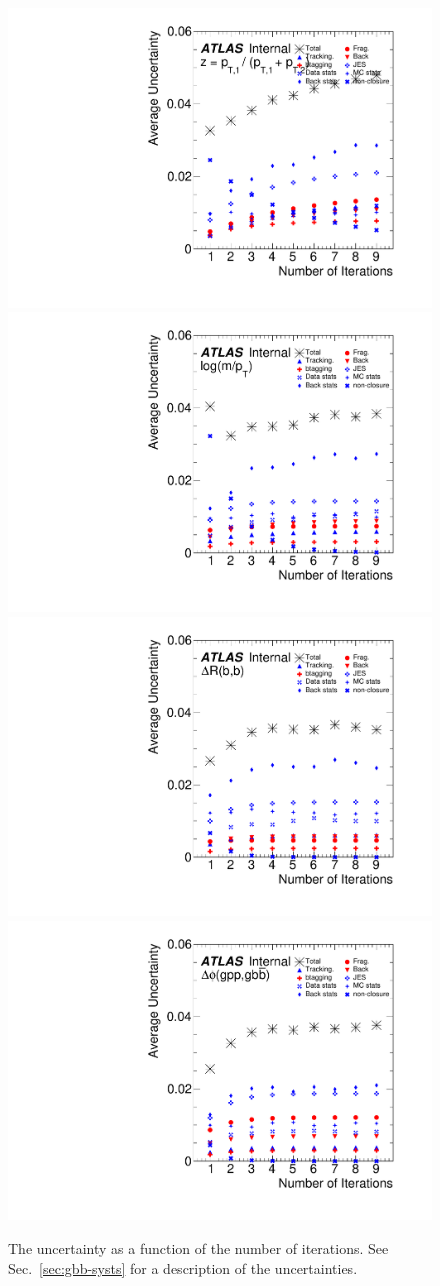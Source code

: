 \begin{figure}[htpb!]
\begin{center}
  \includegraphics[width=0.45\linewidth]{figures/gbb/Unfolding/IterationsTest_ZpT}
  \includegraphics[width=0.45\linewidth]{figures/gbb/Unfolding/IterationsTest_fracmasspt}
  \includegraphics[width=0.45\linewidth]{figures/gbb/Unfolding/IterationsTest_dR}
  \includegraphics[width=0.45\linewidth]{figures/gbb/Unfolding/IterationsTest_dphi}
\caption[]{The uncertainty as a function of the number of iterations.  See Sec.~\ref{sec:gbb-systs} for a description of the uncertainties. } 
\label{fig:gbb-iterations}
\end{center}
\end{figure}

